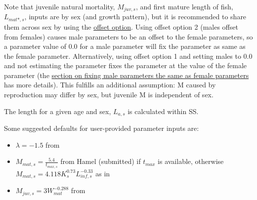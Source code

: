 Note that juvenile natural mortality, $M_{juv,s}$, and first mature length of fish, $L_{mat*,s}$, inputs are by sex (and growth pattern), but it is recommended to share them across sex by using the \hyperlink{offset}{offset option}. Using offset option 2 (males offset from females) causes male parameters to be an offset to the female parameters, so a parameter value of 0.0 for a male parameter will fix the parameter as same as the female parameter. Alternatively, using offset option 1 and setting males to 0.0 and not estimating the parameter fixes the parameter at the value of the female parameter (the \hyperlink{male-shortcut}{section on fixing male parameters the same as female parameters} has more details). This fulfills an additional assumption: M caused by reproduction may differ by sex, but juvenile M is independent of sex.

The length for a given age and sex, $L_{a,s}$ is calculated within SS.

Some suggested defaults for user-provided parameter inputs are:
\begin{itemize}
 \item $\lambda = -1.5$ from \citet{gulland1987natural}
 \item $M_{mat,s}=\frac{5.4}{t_{max,s}}$ from Hamel (submitted) if $t_{max}$ is available, otherwise $M_{mat,s} = 4.118K_{s}^{0.73}L_{inf,s}^{-0.33}$ as in \citet{then2015evaluating} 
 \item $M_{juv,s} = 3W_{mat}^{-0.288}$ from \citet{lorenzen1996relationship}
\end{itemize}

